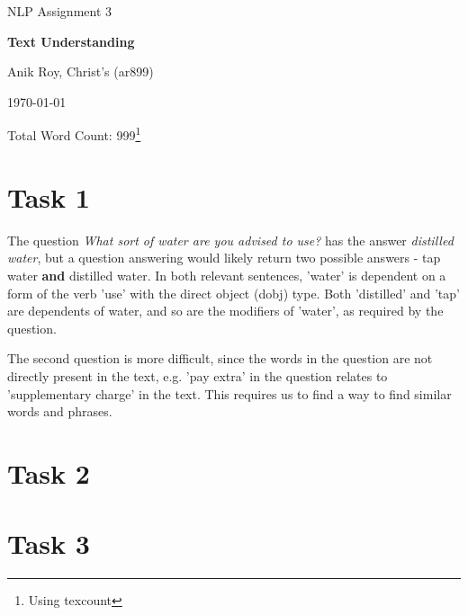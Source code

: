 \documentclass[12pt,a4paper]{article}
\begin{document}
\centerline{\large NLP Assignment 3}
\vspace{0.2in}
\centerline{\Large\bf Text Understanding}
\vspace{0.1in}
\centerline{\large {Anik Roy, Christ's (ar899)}}
\vspace{0.1in}
\centerline{\large {\today}}
\vspace{0.05in}
\centerline{Total Word Count: 999\footnote{Using texcount}}
\vspace{0.2in}



\section*{Task 1}

The question \textit{What sort of water are you advised to use?} has the answer \textit{distilled water}, but a question answering would likely return two possible answers - tap water \textbf{and} distilled water. In both relevant sentences, 'water' is dependent on a form of the verb 'use' with the direct object (dobj) type. Both 'distilled' and 'tap' are dependents of water, and so are the modifiers of 'water', as required by the question.

The second question is more difficult, since the words in the question are not directly present in the text, e.g. 'pay extra' in the question relates to 'supplementary charge' in the text. This requires us to find a way to find similar words and phrases.

\section*{Task 2}
\section*{Task 3}


\end{document}
